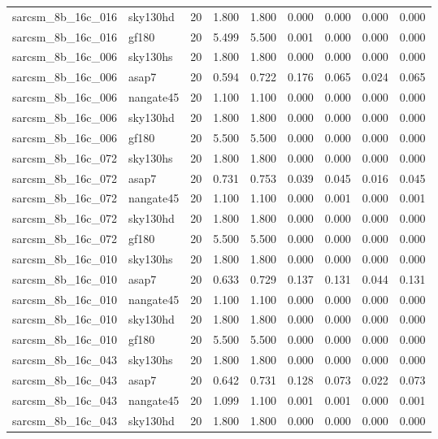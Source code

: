 \begin{tabular}{llrrrrrrr}
sarcsm\_8b\_16c\_016 & sky130hd & 20 & 1.800 & 1.800 & 0.000 & 0.000 & 0.000 & 0.000 \\
sarcsm\_8b\_16c\_016 & gf180 & 20 & 5.499 & 5.500 & 0.001 & 0.000 & 0.000 & 0.000 \\
sarcsm\_8b\_16c\_006 & sky130hs & 20 & 1.800 & 1.800 & 0.000 & 0.000 & 0.000 & 0.000 \\
sarcsm\_8b\_16c\_006 & asap7 & 20 & 0.594 & 0.722 & 0.176 & 0.065 & 0.024 & 0.065 \\
sarcsm\_8b\_16c\_006 & nangate45 & 20 & 1.100 & 1.100 & 0.000 & 0.000 & 0.000 & 0.000 \\
sarcsm\_8b\_16c\_006 & sky130hd & 20 & 1.800 & 1.800 & 0.000 & 0.000 & 0.000 & 0.000 \\
sarcsm\_8b\_16c\_006 & gf180 & 20 & 5.500 & 5.500 & 0.000 & 0.000 & 0.000 & 0.000 \\
sarcsm\_8b\_16c\_072 & sky130hs & 20 & 1.800 & 1.800 & 0.000 & 0.000 & 0.000 & 0.000 \\
sarcsm\_8b\_16c\_072 & asap7 & 20 & 0.731 & 0.753 & 0.039 & 0.045 & 0.016 & 0.045 \\
sarcsm\_8b\_16c\_072 & nangate45 & 20 & 1.100 & 1.100 & 0.000 & 0.001 & 0.000 & 0.001 \\
sarcsm\_8b\_16c\_072 & sky130hd & 20 & 1.800 & 1.800 & 0.000 & 0.000 & 0.000 & 0.000 \\
sarcsm\_8b\_16c\_072 & gf180 & 20 & 5.500 & 5.500 & 0.000 & 0.000 & 0.000 & 0.000 \\
sarcsm\_8b\_16c\_010 & sky130hs & 20 & 1.800 & 1.800 & 0.000 & 0.000 & 0.000 & 0.000 \\
sarcsm\_8b\_16c\_010 & asap7 & 20 & 0.633 & 0.729 & 0.137 & 0.131 & 0.044 & 0.131 \\
sarcsm\_8b\_16c\_010 & nangate45 & 20 & 1.100 & 1.100 & 0.000 & 0.000 & 0.000 & 0.000 \\
sarcsm\_8b\_16c\_010 & sky130hd & 20 & 1.800 & 1.800 & 0.000 & 0.000 & 0.000 & 0.000 \\
sarcsm\_8b\_16c\_010 & gf180 & 20 & 5.500 & 5.500 & 0.000 & 0.000 & 0.000 & 0.000 \\
sarcsm\_8b\_16c\_043 & sky130hs & 20 & 1.800 & 1.800 & 0.000 & 0.000 & 0.000 & 0.000 \\
sarcsm\_8b\_16c\_043 & asap7 & 20 & 0.642 & 0.731 & 0.128 & 0.073 & 0.022 & 0.073 \\
sarcsm\_8b\_16c\_043 & nangate45 & 20 & 1.099 & 1.100 & 0.001 & 0.001 & 0.000 & 0.001 \\
sarcsm\_8b\_16c\_043 & sky130hd & 20 & 1.800 & 1.800 & 0.000 & 0.000 & 0.000 & 0.000 \\

\end{tabular}
